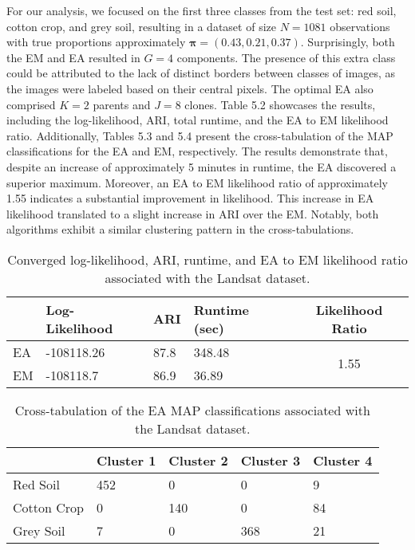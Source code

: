 \documentclass[12pt]{report}
\begin{document}
For our analysis, we focused on the first three classes from the test set: red soil, cotton crop, and grey soil, resulting in a dataset of size $N = 1081$ observations with true proportions approximately $\bm{\pi} = (0.43, 0.21, 0.37)$. Surprisingly, both the EM and EA resulted in $G=4$ components. The presence of this extra class could be attributed to the lack of distinct borders between classes of images, as the images were labeled based on their central pixels. The optimal EA also comprised $K=2$ parents and $J=8$ clones. Table 5.2 showcases the results, including the log-likelihood, ARI, total runtime, and the EA to EM likelihood ratio. Additionally, Tables 5.3 and 5.4 present the cross-tabulation of the MAP classifications for the EA and EM, respectively. The results demonstrate that, despite an increase of approximately 5 minutes in runtime, the EA discovered a superior maximum. Moreover, an EA to EM likelihood ratio of approximately 1.55 indicates a substantial improvement in likelihood. This increase in EA likelihood translated to a slight increase in ARI over the EM. Notably, both algorithms exhibit a similar clustering pattern in the cross-tabulations.


\newpage
\begin{table}[!htbp]
  \caption{Converged log-likelihood, ARI, runtime, and EA to EM likelihood ratio associated with the Landsat dataset.}
    \vspace{0.5cm}
  \begin{tabularx}{\textwidth}{l *{3}{X}c}
  \toprule
    &\textbf{Log-Likelihood}& \textbf{ARI} & \textbf{Runtime (sec)} & \textbf{Likelihood Ratio} \\
  \midrule
   EA & -108118.26     & 87.8 &  348.48 & \multirow{2}{*}{1.55}\\
  EM & -108118.7          & 86.9 & 36.89    \\
  \bottomrule
  \end{tabularx}
\end{table}

\begin{table}[!htbp]
  \caption{Cross-tabulation of the EA MAP classifications associated with the Landsat dataset.}
    \vspace{0.5cm}
  \begin{tabularx}{\textwidth}{l *{4}{X}}
  \toprule
   &\textbf{Cluster 1}  & \textbf{Cluster 2}  & \textbf{Cluster 3}  & \textbf{Cluster 4}   \\
  \midrule
  Red Soil & 	452 & 0 & 0 & 9\\
  Cotton Crop &0 & 140 &  0 & 84 \\
   Grey Soil &   7 & 0 &  368  & 21\\
  \bottomrule
  \end{tabularx}
\end{table}
\end{document}
